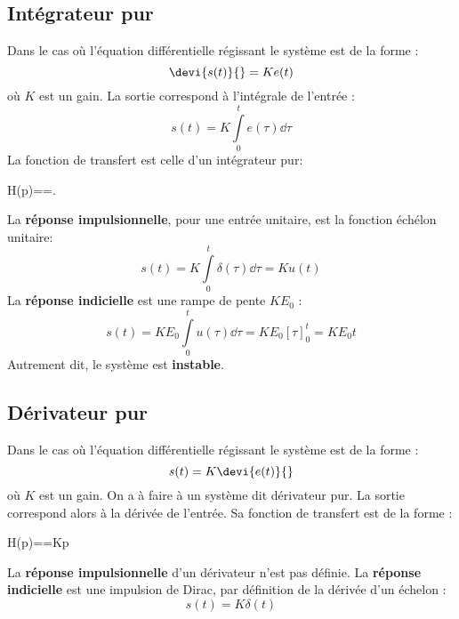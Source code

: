 \subsection{Intégrateur pur}
Dans le cas où l'équation différentielle régissant le système est de la forme :
\[
\devi{s(t)}{}=Ke(t)
\]
où $K$ est un gain. La sortie correspond à l'intégrale de l'entrée :
\[
s(t)=K\int\limits_0^t e(\tau)\dd{\tau}
\]
La fonction de transfert est celle d'un intégrateur pur:
\begin{bequation}
H(p)==.
\end{bequation}
La \textbf{réponse impulsionnelle}, pour une entrée unitaire, est la 
fonction échélon unitaire:
\[
s(t)=K\int\limits_0^t \delta(\tau)\dd{\tau}=Ku(t)
\]
La  \textbf{réponse indicielle} est une rampe de pente $KE_0$ :
\[
s(t)=KE_0\int\limits_0^t u(\tau)\dd{\tau}=KE_0\left[\tau\right]_0^t=KE_0t
\]
Autrement dit, le système est \textbf{instable}.
\subsection{Dérivateur pur}
Dans le cas où l'équation différentielle régissant le système est de la forme :
\[
s(t)=K\devi{e(t)}{}
\]
où $K$ est un gain. On a à faire à un système dit dérivateur pur. 
La sortie correspond alors à la dérivée de l'entrée.
Sa fonction de transfert est de la forme :
\begin{bequation}
H(p)==Kp
\end{bequation}
La \textbf{réponse impulsionnelle} d'un dérivateur n'est pas définie. 
La \textbf{réponse indicielle} est une impulsion de Dirac, par 
définition de la dérivée d'un échelon :
\[
s(t)=K\delta(t)
\]
